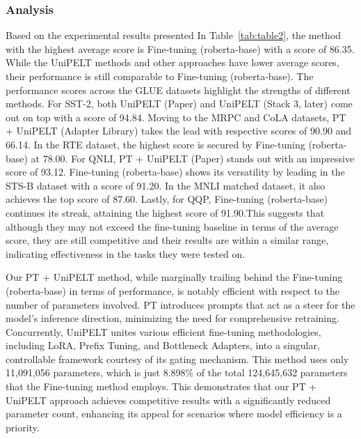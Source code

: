 \documentclass[10pt,twocolumn,letterpaper]{article}
\begin{document}
\subsubsection{Analysis}
Based on the experimental results presented In Table~\ref{tab:table2}, the method with the highest average score is Fine-tuning (roberta-base) with a score of 86.35. While the UniPELT methods and other approaches have lower average scores, their performance is still comparable to Fine-tuning (roberta-base). The performance scores across the GLUE datasets highlight the strengths of different methods. For SST-2, both UniPELT (Paper) and UniPELT (Stack 3, later) come out on top with a score of 94.84. Moving to the MRPC and CoLA datasets, PT + UniPELT (Adapter Library) takes the lead with respective scores of 90.90 and 66.14. In the RTE dataset, the highest score is secured by Fine-tuning (roberta-base) at 78.00. For QNLI, PT + UniPELT (Paper) stands out with an impressive score of 93.12. Fine-tuning (roberta-base) shows its versatility by leading in the STS-B dataset with a score of 91.20. In the MNLI matched dataset, it also achieves the top score of 87.60. Lastly, for QQP, Fine-tuning (roberta-base) continues its streak, attaining the highest score of 91.90.This suggests that although they may not exceed the fine-tuning baseline in terms of the average score, they are still competitive and their results are within a similar range, indicating effectiveness in the tasks they were tested on.

Our PT + UniPELT  method, while marginally trailing behind the Fine-tuning (roberta-base) in terms of performance, is notably efficient with respect to the number of parameters involved. PT introduces prompts that act as a steer for the model’s inference direction, minimizing the need for comprehensive retraining. Concurrently, UniPELT unites various efficient fine-tuning methodologies, including LoRA, Prefix Tuning, and Bottleneck Adapters, into a singular, controllable framework courtesy of its gating mechanism. This method uses only 11,091,056 parameters, which is just 8.898\% of the total 124,645,632 parameters that the Fine-tuning method employs. This demonstrates that our PT + UniPELT approach achieves competitive results with a significantly reduced parameter count, enhancing its appeal for scenarios where model efficiency is a priority. 
\end{document}
